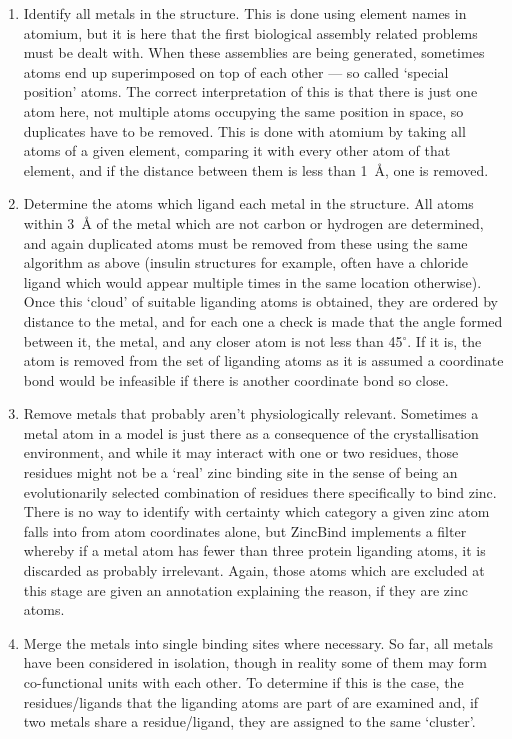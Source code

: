 \begin{enumerate}
   \item Identify all metals in the structure. This is done using element names in atomium, but it is here that the first biological assembly related problems must be dealt with. When these assemblies are being generated, sometimes atoms end up superimposed on top of each other --- so called `special position' atoms. The correct interpretation of this is that there is just one atom here, not multiple atoms occupying the same position in space, so duplicates have to be removed. This is done with atomium by taking all atoms of a given element, comparing it with every other atom of that element, and if the distance between them is less than 1~{\AA}, one is removed.
   \item Determine the atoms which ligand each metal in the structure. All atoms within 3~{\AA} of the metal which are not carbon or hydrogen are determined, and again duplicated atoms must be removed from these using the same algorithm as above (insulin structures for example, often have a chloride ligand which would appear multiple times in the same location otherwise). Once this `cloud' of suitable liganding atoms is obtained, they are ordered by distance to the metal, and for each one a check is made that the angle formed between it, the metal, and any closer atom is not less than 45$^\circ$. If it is, the atom is removed from the set of liganding atoms as it is assumed a coordinate bond would be infeasible if there is another coordinate bond so close.
   \item Remove metals that probably aren't physiologically relevant. Sometimes a metal atom in a model is just there as a consequence of the crystallisation environment, and while it may interact with one or two residues, those residues might not be a `real' zinc binding site in the sense of being an evolutionarily selected combination of residues there specifically to bind zinc. There is no way to identify with certainty which category a given zinc atom falls into from atom coordinates alone, but ZincBind implements a filter whereby if a metal atom has fewer than three protein liganding atoms, it is discarded as probably irrelevant. Again, those atoms which are excluded at this stage are given an annotation explaining the reason, if they are zinc atoms.
   \item Merge the metals into single binding sites where necessary. So far, all metals have been considered in isolation, though in reality some of them may form co-functional units with each other. To determine if this is the case, the residues/ligands that the liganding atoms are part of are examined and, if two metals share a residue/ligand, they are assigned to the same `cluster'.

\end{enumerate}
